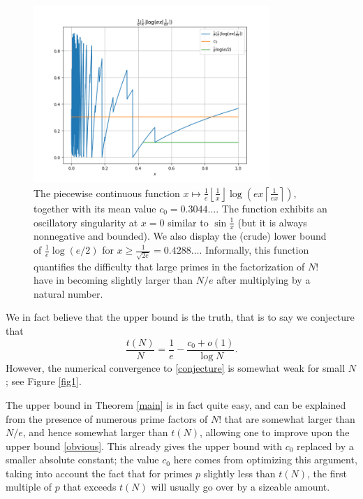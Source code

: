 \documentclass[12pt,a4paper,reqno]{amsart}
\numberwithin{equation}{section}
\theoremstyle{plain}
\theoremstyle{definition}
\begin{document}
\begin{figure}
  \centering
  \includegraphics[width=0.8\textwidth]{integ.png}
  \caption{The piecewise continuous function $x\mapsto \frac{1}{e} \left \lfloor \frac{1}{x} \right\rfloor \log( ex \left \lceil \frac{1}{ex} \right\rceil)$, together with its mean value $c_0 = 0.3044\dots$.  The function exhibits an oscillatory singularity at $x=0$ similar to $\sin \frac{1}{x}$ (but it is always nonnegative and bounded). We also display the (crude) lower bound of $\frac{1}{e} \log(e/2)$ for $x \geq \frac{1}{\sqrt{2e}} = 0.4288\dots$. Informally, this function quantifies the difficulty that large primes in the factorization of $N!$ have in becoming slightly larger than $N/e$ after multiplying by a natural number.}\label{fig-mean}
\end{figure}

We in fact believe that the upper bound is the truth, that is to say we conjecture that
\begin{equation}\label{conjecture}
  \frac{t(N)}{N} = \frac{1}{e} - \frac{c_0+o(1)}{\log N}.
\end{equation}
However, the numerical convergence to \eqref{conjecture} is somewhat weak for small $N$; see Figure \ref{fig1}.

The upper bound in Theorem \ref{main} is in fact quite easy, and can be explained from the presence of numerous prime factors of $N!$ that are somewhat larger than $N/e$, and hence somewhat larger than $t(N)$, allowing one to improve upon the upper bound \eqref{obvious}.  This already gives the upper bound with $c_0$ replaced by a smaller absolute constant; the value $c_0$ here comes from optimizing this argument, taking into account the fact that for primes $p$ slightly less than $t(N)$, the first multiple of $p$ that exceeds $t(N)$ will usually go over by a sizeable amount.
\end{document}
